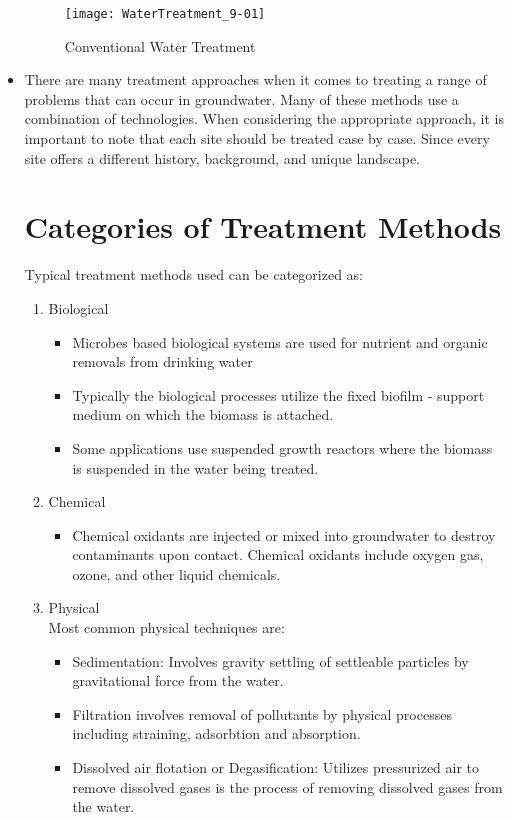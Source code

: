 \begin{itemize}
\begin{figure}[h]
\begin{center}
\texttt{[image: WaterTreatment\_9-01]}
\caption{Conventional Water Treatment}
\end{center}
\end{figure}

\item There are many treatment approaches when it comes to treating a range of problems that can occur in groundwater. Many of these methods use a combination of technologies. When considering the appropriate approach, it is important to note that each site should be treated case by case. Since every site offers a different history, background, and unique landscape. 

\section{Categories of Treatment Methods}
Typical treatment methods used can be categorized as:

\begin{enumerate}
\item Biological\\
\begin{itemize}
\item Microbes based biological systems are used for nutrient and organic removals from drinking water
\item Typically the biological processes utilize the fixed biofilm - support medium on which the biomass is attached.
\item Some applications use suspended growth reactors where the biomass is suspended in the water being treated. 
\end{itemize}

\item Chemical\\
\begin{itemize}
\item Chemical oxidants are injected or mixed into groundwater to destroy contaminants upon contact. Chemical oxidants include oxygen gas, ozone, and other liquid chemicals.\\
\end{itemize}
\item Physical\\
Most common physical techniques are:\\
\begin{itemize}
\item Sedimentation:  Involves gravity settling of settleable particles by gravitational force from the water.
\item Filtration involves removal of pollutants by physical processes including straining, adsorbtion and absorption.
\item Dissolved air flotation or Degasification:  Utilizes pressurized air to remove dissolved gases is the process of removing dissolved gases from the water.


\end{itemize}
\end{enumerate}
\end{itemize}
